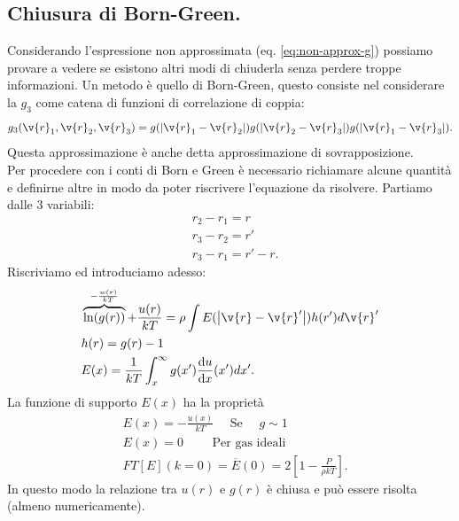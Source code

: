 \subsection{Chiusura di Born-Green.}
\label{subsec:Chiusura di Borhn Green.}
Considerando l'espressione non approssimata (eq. \ref{eq:non-approx-g}) possiamo provare a vedere se esistono altri modi di chiuderla senza perdere troppe informazioni. Un metodo è quello di Born-Green, questo consiste nel considerare la $g_3$ come catena di funzioni di correlazione di coppia:
\[
	g_3(\v{r}_1,\v{r}_2,\v{r}_3)
	=
	g(\left|\v{r}_1-\v{r}_2\right|) 
	g(\left|\v{r}_2-\v{r}_3\right|) 
	g(\left|\v{r}_1-\v{r}_3\right|)
.\]
Questa approssimazione è anche detta approssimazione di sovrapposizione.\\
Per procedere con i conti di Born e Green è necessario richiamare alcune quantità e definirne altre in modo da poter riscrivere l'equazione da risolvere. Partiamo dalle 3 variabili:
\[\begin{aligned}
	&r_2-r_1 = r\\
	&r_3-r_2 = r' \\
	&r_3-r_1 = r'-r
.\end{aligned}\]
Riscriviamo ed introduciamo adesso:
\[\begin{aligned}
	&
	\overbrace{
	\ln(g(r))}^{-\frac{w(r)}{kT}} + \frac{u(r)}{kT} 
	=
	\rho \int E(\left| \v{r}-\v{r}' \right|)h(r')d \v{r}'\\
	&h(r) = g(r)-1\\
	&E(x) = \frac{1}{kT}\int_{x}^{\infty}g(x')\frac{\mbox{d} u}{\mbox{d} x} (x')dx' 
	\label{eq:B-G-approx}
.\end{aligned}\]
La funzione di supporto $E(x)$ ha la proprietà 
\[\begin{aligned}
	&E(x) = -\frac{u(x)}{kT} \quad \text{ Se } \quad g \sim 1\\
	&E(x) = 0 \quad \quad\text{ Per gas ideali}\\
	&FT\left[ E \right] (k=0) = \overline{E}(0) = 2\left[ 1-\frac{P}{\rho kT} \right] 
.\end{aligned}\]
In questo modo la relazione tra $u(r)$ e $g(r)$ è chiusa e può essere risolta (almeno numericamente).
